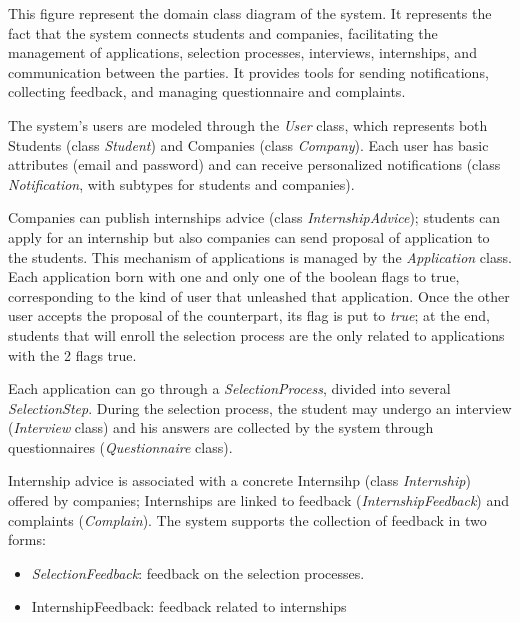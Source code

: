 			This figure represent the domain class diagram of the system. It represents the fact that the system connects students and companies, facilitating the management of applications, selection processes, interviews, internships, and communication between the parties. It provides tools for sending notifications, collecting feedback, and managing questionnaire and complaints.
			
			The system's users are modeled through the \textit{User} class, which represents both Students (class \textit{Student}) and Companies (class \textit{Company}). Each user has basic attributes (email and password) and can receive personalized notifications (class \textit{Notification}, with subtypes for students and companies).
			
			Companies can publish internships advice (class \textit{InternshipAdvice}); students can apply for an internship but also companies can send proposal of application to the students. This mechanism of applications is managed by the \textit{Application} class. Each application born with one and only one of the boolean flags to true, corresponding to the kind of user that unleashed that application. Once the other user accepts the proposal of the counterpart, its flag is put to \textit{true}; at the end, students that will enroll the selection process are the only related to applications with the 2 flags true.
			
			Each application can go through a \textit{SelectionProcess}, divided into several \textit{SelectionStep}. During the selection process, the student may undergo an interview (\textit{Interview} class) and his answers are collected by the system through questionnaires (\textit{Questionnaire} class).
			
			Internship advice is associated with a concrete Internsihp (class \textit{Internship}) offered by companies; Internships are linked to feedback (\textit{InternshipFeedback}) and complaints (\textit{Complain}). 
			The system supports the collection of feedback in two forms:
			\begin{itemize}
				\item \textit{SelectionFeedback}: feedback on the selection processes.
				\item {InternshipFeedback}: feedback related to internships
			
			\end{itemize}
			
			
			
			
			
